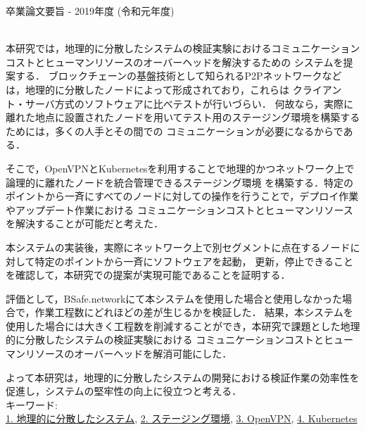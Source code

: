 卒業論文要旨 - 2019年度 (令和元年度)
\begin{center}
\begin{large}
\end{large}
\end{center}

~ \\
本研究では，地理的に分散したシステムの検証実験におけるコミュニケーションコストとヒューマンリソースのオーバーヘッドを解決するための
システムを提案する．
ブロックチェーンの基盤技術として知られるP2Pネットワークなどは，地理的に分散したノードによって形成されており，これらは
クライアント・サーバ方式のソフトウェアに比べテストが行いづらい．
何故なら，実際に離れた地点に設置されたノードを用いてテスト用のステージング環境を構築するためには，多くの人手とその間での
コミュニケーションが必要になるからである．

そこで，OpenVPNとKubernetesを利用することで地理的かつネットワーク上で論理的に離れたノードを統合管理できるステージング環境
を構築する．特定のポイントから一斉にすべてのノードに対しての操作を行うことで，デプロイ作業やアップデート作業における
コミュニケーションコストとヒューマンリソースを解決することが可能だと考えた．

本システムの実装後，実際にネットワーク上で別セグメントに点在するノードに対して特定のポイントから一斉にソフトウェアを起動，
更新，停止できることを確認して，本研究での提案が実現可能であることを証明する．

評価として，BSafe.networkにて本システムを使用した場合と使用しなかった場合で，作業工程数にどれほどの差が生じるかを検証した．
結果，本システムを使用した場合には大きく工程数を削減することができ，本研究で課題とした地理的に分散したシステムの検証実験における
コミュニケーションコストとヒューマンリソースのオーバーヘッドを解消可能にした．

よって本研究は，地理的に分散したシステムの開発における検証作業の効率性を促進し，システムの堅牢性の向上に役立つと考える．
~ \\
キーワード:\\
\underline{1. 地理的に分散したシステム},
\underline{2. ステージング環境},
\underline{3. OpenVPN},
\underline{4. Kubernetes}
\begin{flushright}
\dept \\
\author
\end{flushright}
